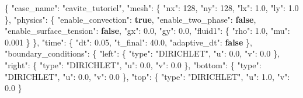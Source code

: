\documentclass[
  french,
]{article}
\newenvironment{Shaded}{}{}
\newcommand{\DataTypeTok}[1]{\textcolor[rgb]{0.56,0.13,0.00}{#1}}
\newcommand{\DecValTok}[1]{\textcolor[rgb]{0.25,0.63,0.44}{#1}}
\newcommand{\FloatTok}[1]{\textcolor[rgb]{0.25,0.63,0.44}{#1}}
\newcommand{\FunctionTok}[1]{\textcolor[rgb]{0.02,0.16,0.49}{#1}}
\newcommand{\KeywordTok}[1]{\textcolor[rgb]{0.00,0.44,0.13}{\textbf{#1}}}
\newcommand{\StringTok}[1]{\textcolor[rgb]{0.25,0.44,0.63}{#1}}
\begin{document}
\begin{Shaded}
\begin{Highlighting}[]
\FunctionTok{\{}
  \DataTypeTok{"case\_name"}\FunctionTok{:} \StringTok{"cavite\_tutoriel"}\FunctionTok{,}
  \DataTypeTok{"mesh"}\FunctionTok{:} \FunctionTok{\{}
    \DataTypeTok{"nx"}\FunctionTok{:} \DecValTok{128}\FunctionTok{,}
    \DataTypeTok{"ny"}\FunctionTok{:} \DecValTok{128}\FunctionTok{,}
    \DataTypeTok{"lx"}\FunctionTok{:} \FloatTok{1.0}\FunctionTok{,}
    \DataTypeTok{"ly"}\FunctionTok{:} \FloatTok{1.0}
  \FunctionTok{\},}
  \DataTypeTok{"physics"}\FunctionTok{:} \FunctionTok{\{}
    \DataTypeTok{"enable\_convection"}\FunctionTok{:} \KeywordTok{true}\FunctionTok{,}
    \DataTypeTok{"enable\_two\_phase"}\FunctionTok{:} \KeywordTok{false}\FunctionTok{,}
    \DataTypeTok{"enable\_surface\_tension"}\FunctionTok{:} \KeywordTok{false}\FunctionTok{,}
    \DataTypeTok{"gx"}\FunctionTok{:} \FloatTok{0.0}\FunctionTok{,}
    \DataTypeTok{"gy"}\FunctionTok{:} \FloatTok{0.0}\FunctionTok{,}
    \DataTypeTok{"fluid1"}\FunctionTok{:} \FunctionTok{\{}
      \DataTypeTok{"rho"}\FunctionTok{:} \FloatTok{1.0}\FunctionTok{,}
      \DataTypeTok{"mu"}\FunctionTok{:} \FloatTok{0.001}
    \FunctionTok{\}}
  \FunctionTok{\},}
  \DataTypeTok{"time"}\FunctionTok{:} \FunctionTok{\{}
    \DataTypeTok{"dt"}\FunctionTok{:} \FloatTok{0.05}\FunctionTok{,}
    \DataTypeTok{"t\_final"}\FunctionTok{:} \FloatTok{40.0}\FunctionTok{,}
    \DataTypeTok{"adaptive\_dt"}\FunctionTok{:} \KeywordTok{false}
  \FunctionTok{\},}
  \DataTypeTok{"boundary\_conditions"}\FunctionTok{:} \FunctionTok{\{}
    \DataTypeTok{"left"}\FunctionTok{:}   \FunctionTok{\{} \DataTypeTok{"type"}\FunctionTok{:} \StringTok{"DIRICHLET"}\FunctionTok{,} \DataTypeTok{"u"}\FunctionTok{:} \FloatTok{0.0}\FunctionTok{,} \DataTypeTok{"v"}\FunctionTok{:} \FloatTok{0.0} \FunctionTok{\},}
    \DataTypeTok{"right"}\FunctionTok{:}  \FunctionTok{\{} \DataTypeTok{"type"}\FunctionTok{:} \StringTok{"DIRICHLET"}\FunctionTok{,} \DataTypeTok{"u"}\FunctionTok{:} \FloatTok{0.0}\FunctionTok{,} \DataTypeTok{"v"}\FunctionTok{:} \FloatTok{0.0} \FunctionTok{\},}
    \DataTypeTok{"bottom"}\FunctionTok{:} \FunctionTok{\{} \DataTypeTok{"type"}\FunctionTok{:} \StringTok{"DIRICHLET"}\FunctionTok{,} \DataTypeTok{"u"}\FunctionTok{:} \FloatTok{0.0}\FunctionTok{,} \DataTypeTok{"v"}\FunctionTok{:} \FloatTok{0.0} \FunctionTok{\},}
    \DataTypeTok{"top"}\FunctionTok{:}    \FunctionTok{\{} \DataTypeTok{"type"}\FunctionTok{:} \StringTok{"DIRICHLET"}\FunctionTok{,} \DataTypeTok{"u"}\FunctionTok{:} \FloatTok{1.0}\FunctionTok{,} \DataTypeTok{"v"}\FunctionTok{:} \FloatTok{0.0} \FunctionTok{\}}

\end{Highlighting}
\end{Shaded}
\end{document}
